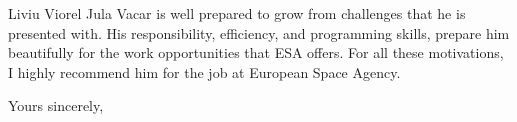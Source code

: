 \documentclass[11pt,a4paper]{letter} %
\begin{document}
\begin{letter}
Liviu Viorel Jula Vacar is well prepared to grow from challenges that he is presented with. His responsibility, efficiency, and programming skills, prepare him beautifully for the work opportunities that ESA offers. For all these motivations, I highly recommend him for the job at European Space Agency.


\closing{Yours sincerely,}


\end{letter}
\end{document}
